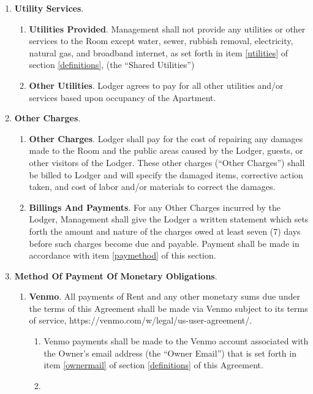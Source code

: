\documentclass[12pt,letterpaper]{article}
\newcommand{\lodger}{Lodger}
\newcommand{\ownermail}{Owner Email}
\newcommand{\management}{Management}
\newcommand{\apt}{Apartment}
\newcommand{\room}{Room}
\newcommand{\utilities}{Shared Utilities}
\begin{document}
\begin{enumerate}
\begin{enumerate}
			\end{enumerate} 
		\item \textbf{Utility Services}. 
			\begin{enumerate} 
				\item \textbf{Utilities Provided}. \management{} shall not provide any utilities or other services to the \room{} except water, sewer, rubbish removal, electricity, natural gas, and broadband internet, as set forth in item \ref{utilities} of section \ref{definitions}, (the ``\utilities{}'')
				\item \textbf{Other Utilities}. \lodger{} agrees to pay for all other utilities and/or services based upon occupancy of the \apt{}.
			\end{enumerate} 
		\item \textbf{Other Charges}. 
			\begin{enumerate} 
				\item \textbf{Other Charges}. \lodger{} shall pay for the cost of repairing any damages made to the \room{} and the public areas caused by the \lodger{}, guests, or other visitors of the \lodger{}. These other charges (``Other Charges'') shall be billed to \lodger{} and will specify the damaged items, corrective action taken, and cost of labor and/or materials to correct the damages. 
				\item \textbf{Billings And Payments}. For any Other Charges incurred by the \lodger{}, \management{} shall give the \lodger{} a written statement which sets forth the amount and nature of the charges owed at least seven (7) days before such charges become due and payable. Payment shall be made in accordance with item \ref{paymethod} of this section. 
			\end{enumerate} 
		\item \textbf{Method Of Payment Of Monetary Obligations}. \label{paymethod}
			\begin{enumerate} 
				\item \textbf{Venmo}. All payments of Rent and any other monetary sums due under the terms of this Agreement shall be made via Venmo subject to its terms of service, https://venmo.com/w/legal/us-user-agreement/. 
					\begin{enumerate}
						\item Venmo payments shall be made to the Venmo account associated with the Owner's email address (the ``\ownermail{}'') that is set forth in item \ref{ownermail} of section \ref{definitions} of this Agreement{}. 
						\item \label{defpaytime} 

\end{enumerate}
\end{enumerate}
\end{enumerate}
\end{document}

